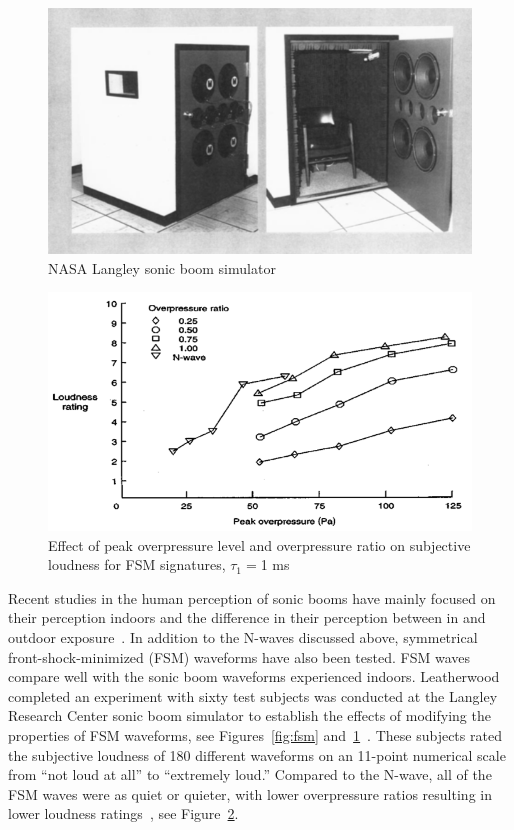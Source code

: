 \documentclass[]{aiaa-tc}%
\begin{document}
\begin{figure}[tb!]
  \centering
  \includegraphics[width=\textwidth]{figs/langley-simulator.png}
  \caption{NASA Langley sonic boom simulator~\cite{leatherwood2002summary}}
  \label{fig:langley-simulator}
\end{figure}

\begin{figure}[tb!]
  \centering
  \includegraphics[width=\textwidth]{figs/fsm-comparison.png}
  \caption{Effect of peak overpressure level and overpressure ratio on subjective loudness for FSM signatures, $\tau_1=$1 ms~\cite{leatherwood2002summary}}
  \label{fig:fsm-comparison}
\end{figure}

Recent studies in the human perception of sonic booms have mainly focused on their perception indoors and the difference in their perception between in and outdoor exposure~\cite{leatherwood2002summary, sullivan2010human}. In addition to the N-waves discussed above, symmetrical front-shock-minimized (FSM) waveforms have also been tested. FSM waves compare well with the sonic boom waveforms experienced indoors. Leatherwood completed an experiment with sixty test subjects was conducted at the Langley Research Center sonic boom simulator to establish the effects of modifying the properties of FSM waveforms, see Figures~\ref{fig:fsm} and~\ref{fig:langley-simulator}~\cite{leatherwood1992laboratory}. These subjects rated the subjective loudness of 180 different waveforms on an 11-point numerical scale from ``not loud at all'' to ``extremely loud.'' Compared to the N-wave, all of the FSM waves were as quiet or quieter, with lower overpressure ratios resulting in lower loudness ratings~\cite{leatherwood2002summary}, see Figure~\ref{fig:fsm-comparison}.
\end{document}
